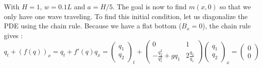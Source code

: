 With $H =1$, $w=0.1L$ and $a=H/5$. The goal is now to find $m(x,0)$ so that we only have one wave traveling. To find this initial condition, let us diagonalize the PDE using the chain rule. Because we have a flat bottom ($B_x=0$), the chain rule gives :
$$q_t+(f(q))_x = q_t + f'(q)q_x = \left(\begin{array}{c}
q_1 \\ 
q_2
\end{array}\right)_t + 
\left(\begin{array}{cc}
0 & 1 \\ 
-\frac{q_2^2}{q_1^2}+gq_1 & 2 \frac{q_2}{q_1}
\end{array}\right)\left(\begin{array}{c}
q_1 \\ 
q_2
\end{array}\right)_x = \left(\begin{array}{c}
0 \\ 
0
\end{array}\right)  $$ 

